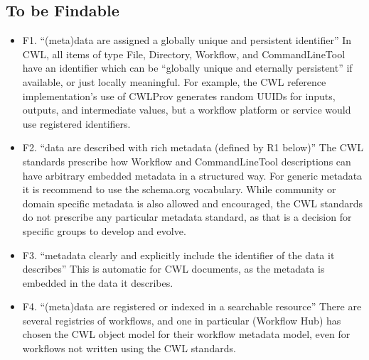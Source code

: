 \subsection{To be Findable}
\begin{itemize}
\item F1. “(meta)data are assigned a globally unique and persistent identifier”
In CWL, all items of type File, Directory, Workflow, and CommandLineTool have an identifier which can be “globally unique and eternally persistent” if available, or just locally meaningful. For example, the CWL reference implementation’s use of CWLProv generates random UUIDs for inputs, outputs, and intermediate values, but a workflow platform or service would use registered identifiers.
\item F2. “data are described with rich metadata (defined by R1 below)”
The CWL standards prescribe how Workflow and CommandLineTool descriptions can have arbitrary embedded metadata in a structured way. For generic metadata it is recommend to use the schema.org vocabulary. While community or domain specific metadata is also allowed and encouraged, the CWL standards do not prescribe any particular metadata standard, as that is a decision for specific groups to develop and evolve.
\item F3. “metadata clearly and explicitly include the identifier of the data it describes”
This is automatic for CWL documents, as the metadata is embedded in the data it describes.
\item F4. “(meta)data are registered or indexed in a searchable resource”
There are several registries of workflows, and one in particular (Workflow Hub) has chosen the CWL object model for their workflow metadata model, even for workflows not written using the CWL standards.
\end{itemize}

